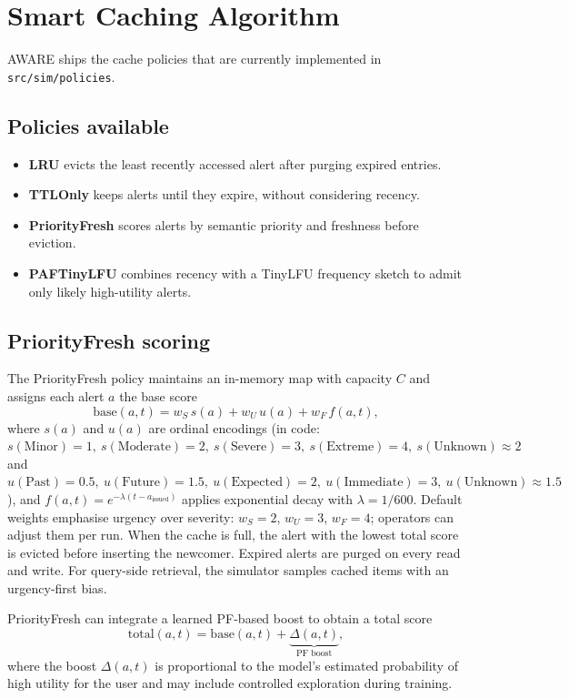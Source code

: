 \documentclass[11pt,twocolumn]{article}
\begin{document}
\section{Smart Caching Algorithm}
AWARE ships the cache policies that are currently implemented in \texttt{src/sim/policies}.

\subsection{Policies available}
\begin{itemize}
    \item \textbf{LRU} evicts the least recently accessed alert after purging expired entries.
    \item \textbf{TTLOnly} keeps alerts until they expire, without considering recency.
    \item \textbf{PriorityFresh} scores alerts by semantic priority and freshness before eviction.
    \item \textbf{PAFTinyLFU} combines recency with a TinyLFU frequency sketch to admit only likely high-utility alerts.
\end{itemize}

\subsection{PriorityFresh scoring}
The PriorityFresh policy maintains an in-memory map with capacity $C$ and assigns each alert $a$ the base score
$$
\mathrm{base}(a,t) = w_S \, s(a) + w_U \, u(a) + w_F \, f(a,t),
$$
where $s(a)$ and $u(a)$ are ordinal encodings (in code: $s(\text{Minor}){=}1,\ s(\text{Moderate}){=}2,\ s(\text{Severe}){=}3,\ s(\text{Extreme}){=}4,\ s(\text{Unknown}){\approx}2$ and $u(\text{Past}){=}0.5,\ u(\text{Future}){=}1.5,\ u(\text{Expected}){=}2,\ u(\text{Immediate}){=}3,\ u(\text{Unknown}){\approx}1.5$), and $f(a,t) = e^{-\lambda (t - a_{\text{issued}})}$ applies exponential decay with $\lambda = 1/600$. Default weights emphasise urgency over severity: $w_S{=}2$, $w_U{=}3$, $w_F{=}4$; operators can adjust them per run. When the cache is full, the alert with the lowest total score is evicted before inserting the newcomer. Expired alerts are purged on every read and write.
For query-side retrieval, the simulator samples cached items with an urgency-first bias.

PriorityFresh can integrate a learned PF-based boost to obtain a total score
$$
\mathrm{total}(a,t) = \mathrm{base}(a,t) + \underbrace{\Delta(a,t)}_{\text{PF boost}},
$$
where the boost $\Delta(a,t)$ is proportional to the model's estimated probability of high utility for the user and may include controlled exploration during training.
\end{document}
